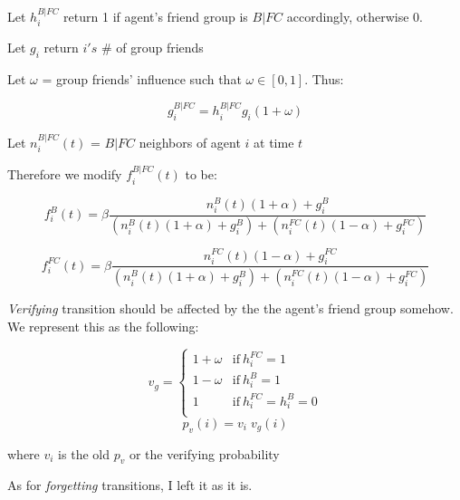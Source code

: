 \documentclass{article}
\begin{document}
Let $h_i^{B|FC}$ return 1 if agent's friend group is $B|FC$ accordingly, otherwise 0.

Let $g_i$ return $i's$ \# of group friends

Let $\omega$ = group friends' influence such that $\omega \in [0,1]$. Thus:

\[g_i^{B|FC} = h_i^{B|FC}g_i(1+\omega)\]

Let $n_i^{B|FC}(t)$ = $B|FC$ neighbors of agent $i$ at time $t$

Therefore we modify $f_i^{B|FC}(t)$ to be:

\[f_i^B(t)=\beta\frac{n_i^B(t)(1+\alpha)+g_i^B}{(n_i^B(t)(1+\alpha)+g_i^B)+(n_i^{FC}(t)(1-\alpha)+g_i^{FC})}\]

\[f_i^{FC}(t)=\beta\frac{n_i^{FC}(t)(1-\alpha)+g_i^{FC}}{(n_i^B(t)(1+\alpha)+g_i^B)+(n_i^{FC}(t)(1-\alpha)+g_i^{FC})}\]

\textit{Verifying} transition should be affected by the
the agent's friend group somehow. We represent this as
the following:

\[ 
  v_g = 
  \begin{cases} 
      1+\omega & \text{if}\ h_i^{FC} = 1 \\
      1-\omega & \text{if}\ h_i^B = 1 \\
      1 & \text{if}\ h_i^{FC} = h_i^B = 0 \\
  \end{cases}
\]
\[ p_v(i) = v_i\;v_g(i) \]

where $v_i$ is the old $p_v$ or the verifying probability

As for \textit{forgetting} transitions, I left it as it is.
%
%
%
%
%
\end{document}
